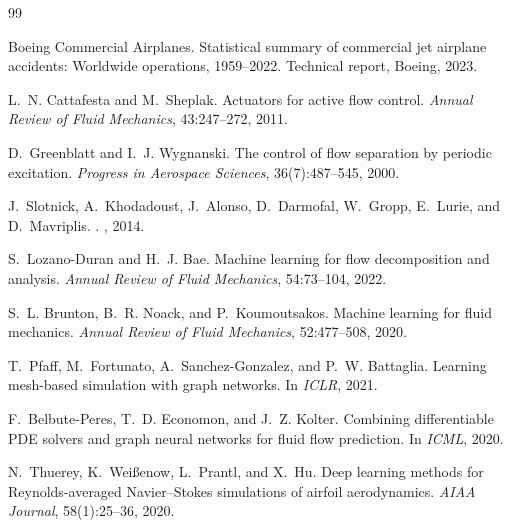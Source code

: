 \documentclass[10pt,twocolumn,letterpaper]{article}
\begin{document}
{
\small


\begin{thebibliography}{99}

Boeing Commercial Airplanes.
\newblock Statistical summary of commercial jet airplane accidents: Worldwide
  operations, 1959--2022.
\newblock Technical report, Boeing, 2023.

L.~N. Cattafesta and M.~Sheplak.
\newblock Actuators for active flow control.
\newblock \emph{Annual Review of Fluid Mechanics}, 43:247--272, 2011.

D.~Greenblatt and I.~J. Wygnanski.
\newblock The control of flow separation by periodic excitation.
\newblock \emph{Progress in Aerospace Sciences}, 36(7):487--545, 2000.

J.~Slotnick, A.~Khodadoust, J.~Alonso, D.~Darmofal, W.~Gropp,
  E.~Lurie, and D.~Mavriplis.
.
, 2014.

S.~Lozano-Duran and H.~J. Bae.
\newblock Machine learning for flow decomposition and analysis.
\newblock \emph{Annual Review of Fluid Mechanics}, 54:73--104, 2022.

S.~L. Brunton, B.~R. Noack, and P.~Koumoutsakos.
\newblock Machine learning for fluid mechanics.
\newblock \emph{Annual Review of Fluid Mechanics}, 52:477--508, 2020.

T.~Pfaff, M.~Fortunato, A.~Sanchez-Gonzalez, and P.~W. Battaglia.
\newblock Learning mesh-based simulation with graph networks.
\newblock In \emph{ICLR}, 2021.

F.~Belbute-Peres, T.~D. Economon, and J.~Z. Kolter.
\newblock Combining differentiable {PDE} solvers and graph neural networks
  for fluid flow prediction.
\newblock In \emph{ICML}, 2020.

N.~Thuerey, K.~Wei{\ss}enow, L.~Prantl, and X.~Hu.
\newblock Deep learning methods for {Reynolds}-averaged {Navier--Stokes}
  simulations of airfoil aerodynamics.
\newblock \emph{AIAA Journal}, 58(1):25--36, 2020.


\end{thebibliography}}
\end{document}
